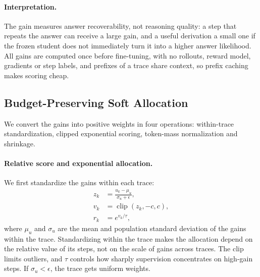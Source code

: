 \paragraph{Interpretation.}
The gain measures answer recoverability, not reasoning quality: a step that repeats the answer can receive a large gain, and a useful derivation a small one if the frozen student does not immediately turn it into a higher answer likelihood.
All gains are computed once before fine-tuning, with no rollouts, reward model, gradients or step labels, and prefixes of a trace share context, so prefix caching makes scoring cheap.

\subsection{Budget-Preserving Soft Allocation}
\label{sec:weights}
We convert the gains into positive weights in four operations: within-trace standardization, clipped exponential scoring, token-mass normalization and shrinkage.

\paragraph{Relative score and exponential allocation.}
We first standardize the gains within each trace:
\begin{equation}
\begin{aligned}
z_k &= \frac{u_k-\mu_u}{\sigma_u+\epsilon},
\\
v_k &= \operatorname{clip}(z_k,-c,c),
\\
r_k &= e^{v_k/\tau},
\end{aligned}
\label{eq:z}
\end{equation}
where $\mu_u$ and $\sigma_u$ are the mean and population standard deviation of the gains within the trace. Standardizing within the trace makes the allocation depend on the relative value of its steps, not on the scale of gains across traces. The clip limits outliers, and $\tau$ controls how sharply supervision concentrates on high-gain steps. If $\sigma_u<\epsilon$, the trace gets uniform weights.

